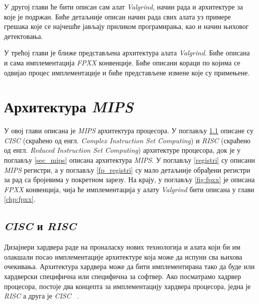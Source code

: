 \documentclass[12pt,oneside]{memoir}
\begin{document}
\indent У другој глави ће бити описан сам алат \textit{Valgrind}, начин рада и архитектуре за које је подржан. Биће детаљније описан начин рада свих алата уз примере грешака које се најчешће јављају приликом програмирања, као и начин њиховог детектовања.

\indent У трећој глави је ближе представљена архитектура алата \textit{Valgrind}. Биће описана и сама имплементација \textit{FPXX} конвенције. Биће описани кораци по којима се одвијао процес имплементације и биће представљене измене које су примењене. 
\chapter{Архитектура \textit{MIPS}}
\label{chp:mips}

\indent У овој глави описана је \textit{MIPS} архитектура процесора. У поглављу \ref{cisc_risc} описане су \textit{CISC} (скраћено од енгл. \textit{Complex Instruction Set Computing}) и \textit{RISC} (скраћено од енгл. \textit{Reduced Instruction Set Computing}) архитектуре процесора, док је у поглављу \ref{sec_mips} описана архитектура \textit{MIPS}. У поглављу  \ref{registri} су описани \textit{MIPS} регистри, а у поглављу \ref{fp_registri} су мало детаљније обрађени регистри за рад са бројевима у покретном зарезу. На крају, у поглављу \ref{fig:fpxx} је описана \textit{FPXX} конвенција, чија ће имплементација у алату \textit{Valgrind} бити описана у глави \ref{chp:fpxx}.

\section{\textit{CISC} и \textit{RISC}}
\label{cisc_risc}

\indent Дизајнери хардвера раде на проналаску нових технологија и алата који би им олакшали посао имплементације архитектуре која може да испуни сва њихова очекивања. Архитектура хардвера може да бити имплементирана тако да буде или хардверски специфична или специфична за софтвер. Ако посматрамо хадрвер процесора, постоје два концепта за имплементацију хардвера процесора, једна је \textit{RISC} а друга је \textit{CISC} ~\cite{rcRef}.
\end{document}
